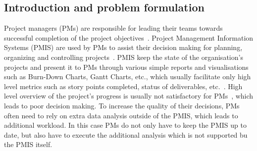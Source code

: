 \documentclass[a4paper, 12pt]{article}
\begin{document}
\subsection{Introduction and problem formulation}


Project managers (PMs) are responsible for leading their teams towards successful completion of the project objectives~\cite{institute2017guide}. Project Management Information Systems (PMIS) are used by PMs to assist their decision making for planning, organizing and controlling projects~\cite{CANIELS2012162}. PMIS keep the state of the organisation's projects and present it to PMs through various simple reports and visualisations such as Burn-Down Charts, Gantt Charts, etc., which usually facilitate only high level metrics such as story points completed, status of deliverables, etc.~\cite{institute2017guide}. High level overview of the project's progress is usually not satisfactory for PMs~\cite{CANIELS2012162}, which leads to poor decision making. To increase the quality of their decisions, PMs often need to rely on extra data analysis outside of the PMIS, which leads to additional workload. In this case PMs do not only have to keep the PMIS up to date, but also have to execute the additional analysis which is not supported bu the PMIS itself.



\end{document}
